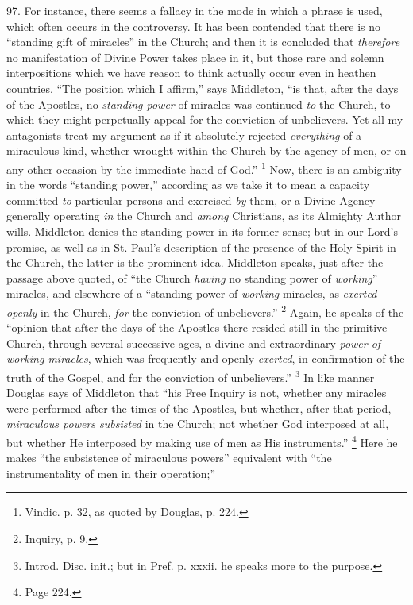 97.
For instance, there seems a fallacy in the mode in which a phrase is
used, which often occurs in the controversy. It has been contended
that there is no ``standing gift of miracles'' in the Church; and
then it is concluded that \emph{therefore} no manifestation of Divine Power takes place in it, but those rare and solemn
interpositions which we have reason to think actually occur even in
heathen countries. ``The position which I affirm,'' says Middleton, ``is
that, after the days of the Apostles, no \emph{standing power} of
miracles was continued \emph{to} the Church, to which they might
perpetually appeal for the conviction of unbelievers. Yet all my
antagonists treat my argument as if it absolutely rejected \emph{everything}
of a miraculous kind, whether wrought within the Church by the agency
of men, or on any other occasion by the immediate hand of God.'' \footnote{Vindic. p. 32, as quoted by Douglas, p. 224.} Now, there is an ambiguity in the words ``standing power,''
according as we take it to mean a capacity committed \emph{to}
particular persons and exercised \emph{by} them, or a Divine Agency
generally operating \emph{in} the Church and \emph{among} Christians,
as its Almighty Author wills. Middleton denies the standing power in
its former sense; but in our Lord's promise, as well as in St. Paul's
description of the presence of the Holy Spirit in the Church, the
latter is the prominent idea. Middleton speaks, just after the passage
above quoted, of ``the Church \emph{having} no standing power of \emph{working}''
miracles, and elsewhere of a ``standing power of \emph{working}
miracles, as \emph{exerted openly} in the Church, \emph{for} the
conviction of unbelievers.'' \footnote{Inquiry, p. 9.}
Again, he speaks of the ``opinion that after the days of the
Apostles there resided still in the primitive Church, through several
successive ages, a divine and extraordinary \emph{power of working
miracles}, which was frequently and openly \emph{exerted}, in
confirmation of the truth of the Gospel, and for the conviction of
unbelievers.'' \footnote{Introd. Disc. init.; but in Pref. p. xxxii. he speaks more to the
purpose.} In like
manner Douglas says of Middleton that ``his Free Inquiry is not,
whether any miracles were performed after the times of the Apostles,
but whether, after that period, \emph{miraculous powers subsisted} in
the Church; not whether God interposed at all, but whether He
interposed by making use of men as His instruments.'' \footnote{Page 224.} Here he makes ``the subsistence of miraculous powers''
equivalent with ``the instrumentality of men in their operation;''
